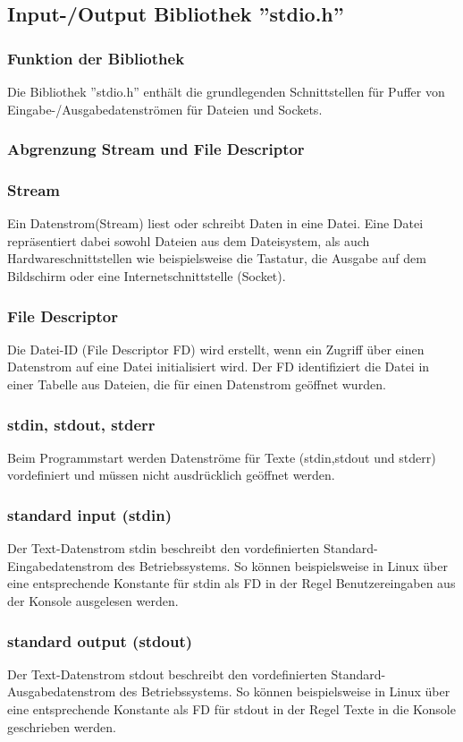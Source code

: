 \documentclass[numbers=noendperiod]{scrartcl}
\begin{document}
\subsection{Input-/Output Bibliothek ''stdio.h''}
\subsubsection{Funktion der Bibliothek}
Die Bibliothek ''stdio.h'' enthält die grundlegenden Schnittstellen für Puffer von Eingabe-/Ausgabedatenströmen für Dateien und Sockets.
\subsubsection{Abgrenzung Stream und File Descriptor}
\subsubsection*{Stream}
Ein Datenstrom(Stream) liest oder schreibt Daten in eine Datei. Eine Datei repräsentiert dabei sowohl Dateien aus dem Dateisystem, als auch Hardwareschnittstellen wie beispielsweise die Tastatur, die Ausgabe auf dem Bildschirm oder eine Internetschnittstelle (Socket). 
\subsubsection*{File Descriptor}
Die Datei-ID (File Descriptor FD) wird erstellt, wenn ein Zugriff über einen Datenstrom auf eine Datei initialisiert wird. Der FD identifiziert die Datei in einer Tabelle aus Dateien, die für einen Datenstrom geöffnet wurden. 
\subsubsection{stdin, stdout, stderr}
Beim Programmstart werden Datenströme für Texte (stdin,stdout und stderr) vordefiniert und müssen nicht ausdrücklich geöffnet werden.
\subsubsection*{standard input (stdin)}
Der Text-Datenstrom stdin beschreibt den vordefinierten Standard-Eingabedatenstrom des Betriebssystems. So können beispielsweise in Linux über eine entsprechende Konstante für stdin als FD in der Regel Benutzereingaben aus der Konsole ausgelesen werden.
\subsubsection*{standard output (stdout)}
Der Text-Datenstrom stdout beschreibt den vordefinierten Standard-Ausgabedatenstrom des Betriebssystems. So können beispielsweise in Linux über eine entsprechende Konstante als FD für stdout in der Regel Texte in die Konsole geschrieben werden.
\end{document}
